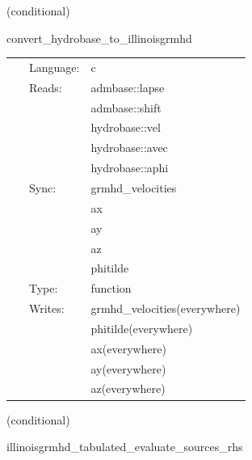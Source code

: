 \documentclass{article}
\begin{document}
   (conditional) 

\hspace{5mm} convert\_hydrobase\_to\_illinoisgrmhd 

\hspace{5mm}{\it convert hydrobase initial data (id) to illinoisgrmhd variables } 


\hspace{5mm}

 \begin{tabular*}{160mm}{cll} 
~ & Language:  & c \\ 
~ & Reads:  & admbase::lapse \\ 
~& ~ &admbase::shift\\ 
~& ~ &hydrobase::vel\\ 
~& ~ &hydrobase::avec\\ 
~& ~ &hydrobase::aphi\\ 
~ & Sync:  & grmhd\_velocities \\ 
~& ~ &ax\\ 
~& ~ &ay\\ 
~& ~ &az\\ 
~& ~ &phitilde\\ 
~ & Type:  & function \\ 
~ & Writes:  & grmhd\_velocities(everywhere) \\ 
~& ~ &phitilde(everywhere)\\ 
~& ~ &ax(everywhere)\\ 
~& ~ &ay(everywhere)\\ 
~& ~ &az(everywhere)\\ 
\end{tabular*} 


\vspace{5mm}

   (conditional) 

\hspace{5mm} illinoisgrmhd\_tabulated\_evaluate\_sources\_rhs 

\hspace{5mm}{\it tabulated version of illinoisgrmhd\_evaluate\_sources\_rhs } 


\hspace{5mm}
\end{document}
